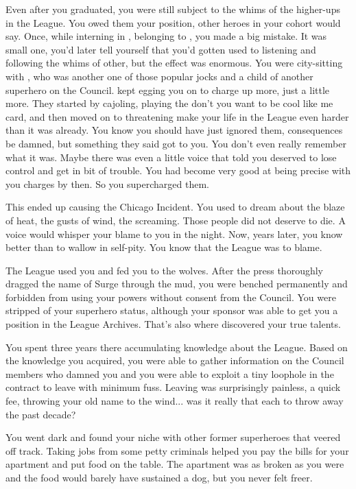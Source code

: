\documentclass[char]{LRSguildcamp1}
\begin{document}
Even after you graduated, you were still subject to the whims of the higher-ups in the League. You owed them your position, other heroes in your cohort would say. Once, while interning in \pCityO{}, belonging to \cOS{\MYsupername}, you made a big mistake. It was small one, you'd later tell yourself that you'd gotten used to listening and following the whims of other, but the effect was enormous. You were city-sitting with  \cJuggernaut{}, who was another one of those popular jocks and a child of another superhero on the Council. \cJuggernaut{\They} kept egging you on to charge \cJuggernaut{\them} up more, just a little more. They started by cajoling, playing the don't you want to be cool like me card, and then moved on to threatening make your life in the League even harder than it was already. You know you should have just ignored them, consequences be damned, but something they said got to you. You don't even really remember what it was. Maybe there was even a little voice that told you \cJuggernaut{\they} deserved to lose control and get in bit of trouble. You had become very good at being precise with you charges by then. So you supercharged them.  

This ended up causing the Chicago Incident. You used to dream about the blaze of heat, the gusts of wind, the screaming. Those people did not deserve to die. A voice would whisper your blame to you in the night. Now, years later, you know better than to wallow in self-pity. You know that the League was to blame.  

The League used you and fed you to the wolves. After the press thoroughly dragged the name of Surge through the mud, you were benched permanently and forbidden from using your powers without consent from the Council. You were stripped of your superhero status, although your sponsor was able to get you a position in the League Archives. That's also where discovered your true talents. 

You spent three years there accumulating knowledge about the League. Based on the knowledge you acquired, you were able to gather information on the Council members who damned you and you were able to exploit a tiny loophole in the contract to leave with minimum fuss.  Leaving was surprisingly painless, a quick fee, throwing your old name to the wind... was it really that each to throw away the past decade?  

You went dark and found your niche with other former superheroes that veered off track. Taking jobs from some petty criminals helped you pay the bills for your apartment and put food on the table. The apartment was as broken as you were and the food would barely have sustained a dog, but you never felt freer. 
\end{document}
